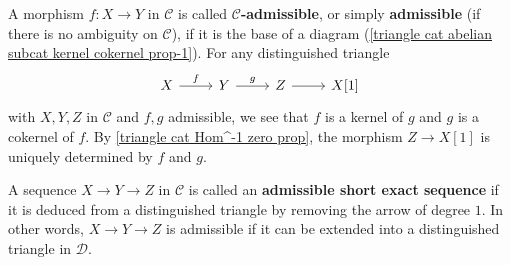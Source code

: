 A morphism $f:X\to Y$ in $\mathcal{C}$ is called \textbf{$\mathcal{C}$-admissible}, or simply \textbf{admissible} (if there is no ambiguity on $\mathcal{C}$), if it is the base of a diagram (\ref{triangle cat abelian subcat kernel cokernel prop-1}). For any distinguished triangle
\[\begin{tikzcd}
X\ar[r,"f"]&Y\ar[r,"g"]&Z\ar[r]&X[1]
\end{tikzcd}\]
with $X,Y,Z$ in $\mathcal{C}$ and $f,g$ admissible, we see that $f$ is a kernel of $g$ and $g$ is a cokernel of $f$. By \cref{triangle cat Hom^-1 zero prop}, the morphism $Z\to X[1]$ is uniquely determined by $f$ and $g$.\par
A sequence $X\to Y\to Z$ in $\mathcal{C}$ is called an \textbf{admissible short exact sequence} if it is deduced from a distinguished triangle by removing the arrow of degree $1$. In other words, $X\to Y\to Z$ is admissible if it can be extended into a distinguished triangle in $\mathcal{D}$.

